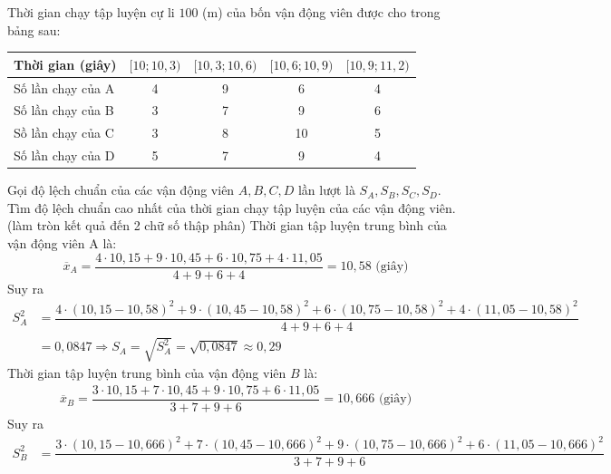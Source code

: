 \begin{bt}%
	Thời gian chạy tập luyện cự li $100$ (m) của bốn vận động viên được cho trong bảng sau:
	\begin{center}
		\begin{tabular}{|l|c|c|c|c|}
			\hline Thời gian (giây) & {$[10 ; 10{,}3)$} & {$[10{,}3 ; 10{,}6)$} & {$[10{,}6 ; 10{,}9)$} & {$[10{,}9 ; 11{,}2)$} \\
			\hline Số lần chạy của A & 4 & 9 & 6 & 4 \\
			\hline Số lần chạy của B & 3 & 7 & 9 & 6 \\
			\hline Sồ lần chạy của C & 3 & 8 & 10 & 5 \\
			\hline Số lần chạy của D & 5 & 7 & 9 & 4 \\
			\hline
		\end{tabular}
	\end{center}
	Gọi độ lệch chuẩn của các vận động viên $A, B, C, D$ lần lượt là ${S}_{{A}}, {S}_{B}, {S}_{C}, {S}_{{D}}$. Tìm độ lệch chuẩn cao nhất của thời gian chạy tập luyện của các vận động viên. (làm tròn kết quả đến 2 chữ số thập phân)
	\loigiai
	{Thời gian tập luyện trung bình của vận động viên A là:
		$$\overline{{x}}_{A}=\dfrac{4 \cdot 10{,}15+9 \cdot 10{,}45+6 \cdot 10{,}75+4 \cdot 11{,}05}{4+9+6+4}=10{,}58 \text{ (giây)}$$
		Suy ra
		\begin{align*}
			{S}_{{A}}^{2}&=\dfrac{4 \cdot(10{,}15-10{,}58)^{2}+9 \cdot(10{,}45-10{,}58)^{2}+6 \cdot(10{,}75-10{,}58)^{2}+4 \cdot(11{,}05-10{,}58)^{2}}{4+9+6+4} \\
			&=0{,}0847 \Rightarrow {S}_{{A}}=\sqrt{{S}_{{A}}^{2}}=\sqrt{0{,}0847} \approx 0{,}29
		\end{align*}
		Thời gian tập luyện trung bình của vận động viên $B$ là:
		\begin{align*}
			\overline{{x}}_{B}=\dfrac{3 \cdot 10{,}15+7 \cdot 10{,}45+9 \cdot 10{,}75+6 \cdot 11{,}05}{3+7+9+6}=10{,}666 \text{ (giây)}
		\end{align*}
		Suy ra
		\begin{align*}
			{S}_{{B}}^{2} & =\dfrac{3 \cdot(10{,}15-10{,}666)^{2}+7 \cdot(10{,}45-10{,}666)^{2}+9 \cdot(10{,}75-10{,}666)^{2}+6 \cdot(11{,}05-10{,}666)^{2}}{3+7+9+6} \\

\end{align*}}
\end{bt}
